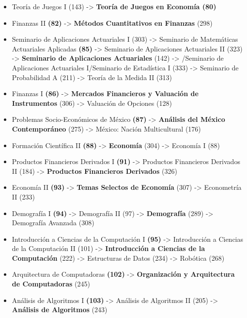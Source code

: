 \begin{appendices}
\begin{enumerate}
\begin{itemize}
  \item Teoría de Juegos I (143) -> \textbf{Teoría de Juegos en Economía (80)}

  \item Finanzas II \textbf{(82)} -> \textbf{Métodos Cuantitativos en Finanzas} (298)
  
  \item Seminario de Aplicaciones Actuariales I (303) -> Seminario de Matemáticas Actuariales Aplicadas \textbf{(85)} -> Seminario de Aplicaciones Actuariales II (323) -> \textbf{Seminario de Aplicaciones Actuariales} (142) -> /Seminario de Aplicaciones Actuariales I/Seminario de Estadística I (333) -> Seminario de Probabilidad A (211) -> Teoría de la Medida II (313)
  
  \item Finanzas I \textbf{(86)} -> \textbf{Mercados Financieros y Valuación de Instrumentos} (306) -> Valuación de Opciones (128)

  \item Problemas Socio-Económicos de México \textbf{(87)} -> \textbf{Análisis del México Contemporáneo} (275) -> México: Nación Multicultural (176)
  
  \item Formación Científica II \textbf{(88)} -> \textbf{Economía} (304) -> Economía I (88)

  \item Productos Financieros Derivados I \textbf{(91)} -> Productos Financieros Derivados II (184) -> \textbf{Productos Financieros Derivados} (326)
  
  \item Economía II \textbf{(93)} -> \textbf{Temas Selectos de Economía} (307) -> Econometría II (233)
  
  \item Demografía I \textbf{(94)} -> Demografía II (97) -> \textbf{Demografía} (289) -> Demografía Avanzada (308)

  \item Introducción a Ciencias de la Computación I \textbf{(95)} -> Introducción a Ciencias de la Computación II (101) -> \textbf{Introducción a Ciencias de la Computación} (222) -> Estructuras de Datos (234) -> Robótica (268)
  
  \item Arquitectura de Computadoras \textbf{(102)} -> \textbf{Organización y Arquitectura de Computadoras} (245)
  
  \item Análisis de Algoritmos I \textbf{(103)} -> Análisis de Algoritmos II (205) -> \textbf{Análisis de Algoritmos} (243)
  

\end{itemize}
\end{enumerate}
\end{appendices}
